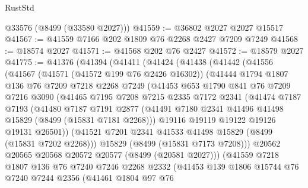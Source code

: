 \begin{lexlean}{RustStd}
\begin{coremodule}
      @33576
      (@8499 (@33580 @2027)))
@41559 := @36802 @2027 @2027 @15517
@41567 := @41559 @7166 @202 @1809 @76 @2268 @2427 @7209 @7249
@41568 := @18574 @2027
@41571 := @41568 @202 @76 @2427
@41572 := @18579 @2027
@41775 := @41376
    (@41394
      (@41411
        (@41424
          (@41438
            (@41442
              (@41556
                (@41567
                  (@41571 (@41572 @199 @76 @2426 @16302))
                  (@41444
                    @1794
                    @1807
                    @136
                    @76
                    @7209
                    @7218
                    @2268
                    @7249
                    (@41453
                      @653
                      @1790
                      @841
                      @76
                      @7209
                      @7216
                      @3090
                      (@41465
                        @7195
                        @7208
                        @7215
                        @2335
                        @7172
                        @2341
                        (@41474
                          @7187
                          @7193
                          (@41480
                            @7187
                            @7191
                            @2877
                            (@41491 @7180 @2341 @41496 @41498 @15829 (@8499 (@15831 @7181 @2268)))
                            @19116
                            @19119
                            @19122
                            @19126
                            @19131
                            @26501))
                        (@41521 @7201 @2341 @41533 @41498 @15829 (@8499 (@15831 @7202 @2268)))
                        @15829
                        (@8499 (@15831 @7173 @7208)))
                      @20562
                      @20565
                      @20568
                      @20572
                      @20577
                      (@8499 (@20581 @2027)))
                    (@41559
                      @7218
                      @1807
                      @136
                      @76
                      @7240
                      @7246
                      @2268
                      @2332
                      (@41453
                        @139
                        @1806
                        @15744
                        @76
                        @7240
                        @7244
                        @2356
                        (@41461
                          @1804
                          @97
                          @76

\end{coremodule}
\end{lexlean}
